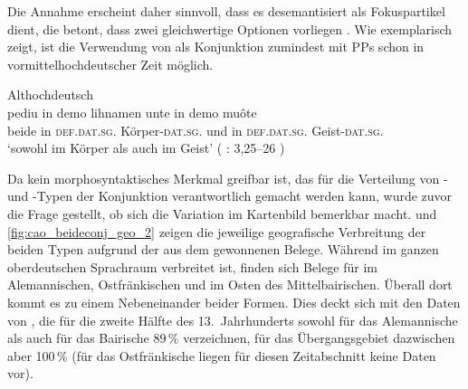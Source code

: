 Die Annahme erscheint daher sinnvoll, dass es desemantisiert als Fokuspartikel
dient, die betont, dass zwei gleichwertige Optionen vorliegen
\autocite[425--428]{johannessen2005}. Wie 
exemplarisch zeigt, ist die Verwendung von  als Konjunktion
zumindest mit PPs schon in vormittelhochdeutscher Zeit
möglich.

\begin{exe}
\ex \label{ex:beideintiahd_3_copy}
	\langinfo%
		{Althochdeutsch}
		{}
		{\cite[171]{steinmeyer1916}}\\
	\gll pediu in demo lihnamen unte in demo muôte \\
		beide in \textsc{def.dat.sg.\MascI} Körper-\textsc{dat.sg.\MascI} und in
			\textsc{def.dat.sg.\MascI} Geist-\textsc{dat.sg.\MascI} \\
	\trans `sowohl im Körper als auch im Geist'
		(%
			: 3,25--26
		)
\end{exe}

Da kein morphosyntaktisches Merkmal greifbar ist, das für die Verteilung von
- und -Typen der Konjunktion verantwortlich gemacht
werden kann, wurde zuvor die Frage gestellt, ob sich die Variation im
Kartenbild bemerkbar macht.
 und \ref{fig:cao_beideconj_geo_2} zeigen die
jeweilige geografische Verbreitung der beiden Typen aufgrund der aus dem \CAO{}
gewonnenen Belege. Während  im ganzen
oberdeutschen Sprachraum verbreitet ist, finden sich Belege für
 im Alemannischen, Ostfränkischen
und im Osten des Mittelbairischen. Überall dort kommt es zu einem
Nebeneinander beider Formen. Dies deckt sich mit den Daten von
\citet[627]{ksw2}, die für die zweite Hälfte des 13.~Jahrhunderts sowohl für
das Alemannische als auch für das Bairische 89\,\%
 verzeichnen, für das Übergangsgebiet dazwischen aber 100\,\% (für
das Ostfränkische liegen für diesen Zeitabschnitt keine Daten
vor).

